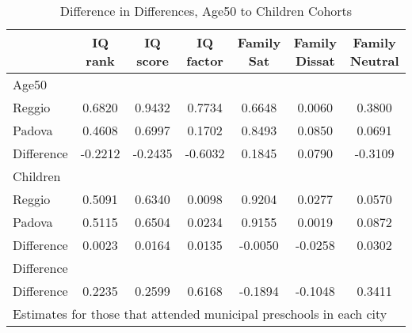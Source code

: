 \begin{table}[htbp]\centering
\caption{Difference in Differences, Age50 to Children Cohorts}
\begin{tabular}{l*{6}{c}}
\hline\hline
            &     IQ rank&    IQ score&   IQ factor&  Family Sat&Family Dissat&Family Neutral\\
\hline
Age50       &            &            &            &            &            &            \\
Reggio      &      0.6820&      0.9432&      0.7734&      0.6648&      0.0060&      0.3800\\
Padova      &      0.4608&      0.6997&      0.1702&      0.8493&      0.0850&      0.0691\\
Difference  &     -0.2212&     -0.2435&     -0.6032&      0.1845&      0.0790&     -0.3109\\
\hline
Children    &            &            &            &            &            &            \\
Reggio      &      0.5091&      0.6340&      0.0098&      0.9204&      0.0277&      0.0570\\
Padova      &      0.5115&      0.6504&      0.0234&      0.9155&      0.0019&      0.0872\\
Difference  &      0.0023&      0.0164&      0.0135&     -0.0050&     -0.0258&      0.0302\\
\hline
Difference  &            &            &            &            &            &            \\
Difference  &      0.2235&      0.2599&      0.6168&     -0.1894&     -0.1048&      0.3411\\
\hline\hline
\multicolumn{7}{l}{\footnotesize Estimates for those that attended municipal preschools in each city}\\
\end{tabular}
\end{table}

